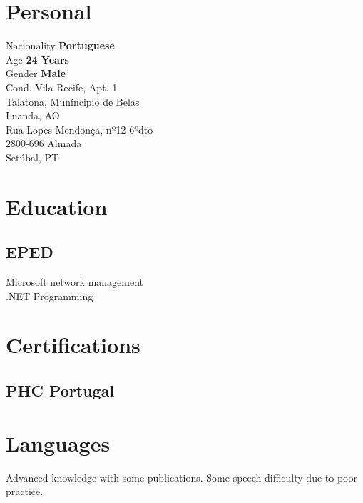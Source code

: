 \documentclass[letterpaper]{deedy-resume} %
\begin{document}
\begin{minipage}[t]{0.33\textwidth}

\section{Personal} 

Nacionality \textbf{Portuguese}\\
Age \textbf{24 Years}\\
Gender \textbf{Male}\\

Cond. Vila Recife, Apt. 1\\
Talatona, Muníncipio de Belas\\
Luanda, AO\\
\sectionspace{}
Rua Lopes Mendonça, nº12 6ºdto\\
2800-696 Almada\\
Setúbal, PT\\

\sectionspace

\section{Education}
\subsection{EPED}
Microsoft network management\\
.NET Programming

\sectionspace

\section{Certifications}
\subsection{PHC Portugal}

\sectionspace

\section{Languages}
Advanced knowledge with some publications. Some speech difficulty due to poor practice.


\end{minipage}
\end{document}
